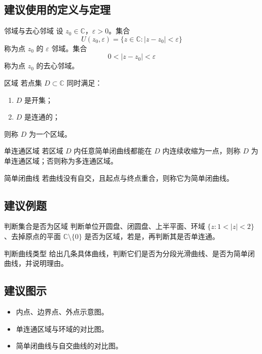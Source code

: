 \subsection*{建议使用的定义与定理}
\begin{dingliyi}{邻域与去心邻域}{}
设 $z_0\in\mathbb{C}$，$\varepsilon>0$。集合
\[
    U(z_0,\varepsilon)=\{z\in\mathbb{C}:|z-z_0|<\varepsilon\}
\]
称为点 $z_0$ 的 $\varepsilon$ 邻域。集合
\[
    0<|z-z_0|<\varepsilon
\]
称为点 $z_0$ 的去心邻域。
\end{dingliyi}

\begin{dingliyi}{区域}{}
若点集 $D\subset\mathbb{C}$ 同时满足：
\begin{enumerate}
    \item $D$ 是开集；
    \item $D$ 是连通的；
\end{enumerate}
则称 $D$ 为一个区域。
\end{dingliyi}

\begin{dingliyi}{单连通区域}{}
若区域 $D$ 内任意简单闭曲线都能在 $D$ 内连续收缩为一点，则称 $D$ 为单连通区域；否则称为多连通区域。
\end{dingliyi}

\begin{dingliyi}{简单闭曲线}{}
若曲线没有自交，且起点与终点重合，则称它为简单闭曲线。
\end{dingliyi}

\subsection*{建议例题}
\begin{lizi}{判断集合是否为区域}{}
判断单位开圆盘、闭圆盘、上半平面、环域 $\{z:1<|z|<2\}$、去掉原点的平面 $\mathbb{C}\setminus\{0\}$ 是否为区域，若是，再判断其是否单连通。
\end{lizi}

\begin{lizi}{判断曲线类型}{}
给出几条具体曲线，判断它们是否为分段光滑曲线、是否为简单闭曲线，并说明理由。
\end{lizi}

\subsection*{建议图示}
\begin{itemize}
    \item 内点、边界点、外点示意图。
    \item 单连通区域与环域的对比图。
    \item 简单闭曲线与自交曲线的对比图。
\end{itemize}

